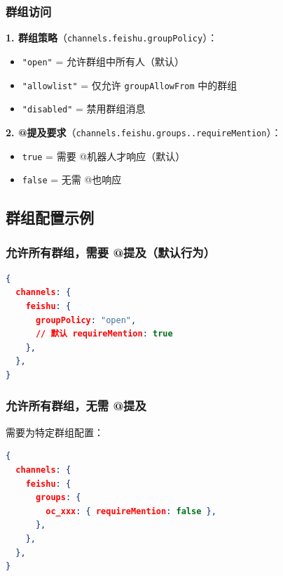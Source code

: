 \subsubsection{群组访问}


\textbf{1. 群组策略}（\texttt{channels.feishu.groupPolicy}）：

\begin{itemize}
  \item \texttt{"open"} = 允许群组中所有人（默认）
  \item \texttt{"allowlist"} = 仅允许 \texttt{groupAllowFrom} 中的群组
  \item \texttt{"disabled"} = 禁用群组消息
\end{itemize}


\textbf{2. @提及要求}（\texttt{channels.feishu.groups..requireMention}）：

\begin{itemize}
  \item \texttt{true} = 需要 @机器人才响应（默认）
  \item \texttt{false} = 无需 @也响应
\end{itemize}


\hrulefill


\subsection{群组配置示例}


\subsubsection{允许所有群组，需要 @提及（默认行为）}


\begin{lstlisting}[language=json]
{
  channels: {
    feishu: {
      groupPolicy: "open",
      // 默认 requireMention: true
    },
  },
}
\end{lstlisting}


\subsubsection{允许所有群组，无需 @提及}


需要为特定群组配置：

\begin{lstlisting}[language=json]
{
  channels: {
    feishu: {
      groups: {
        oc_xxx: { requireMention: false },
      },
    },
  },
}
\end{lstlisting}


